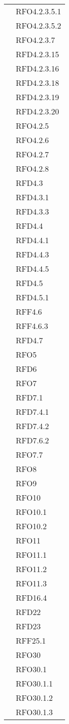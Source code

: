\begin{longtable}{|>{\centering}m{10cm}|m{3cm}<{\centering}|}
& RFO4.2.3.5.1\\
& RFO4.2.3.5.2\\
& RFO4.2.3.7\\
& RFD4.2.3.15\\
& RFD4.2.3.16\\
& RFD4.2.3.18\\
& RFD4.2.3.19\\
& RFD4.2.3.20\\
& RFO4.2.5\\
& RFO4.2.6\\
& RFO4.2.7\\
& RFO4.2.8\\
& RFD4.3\\
& RFD4.3.1\\
& RFD4.3.3\\
& RFD4.4\\
& RFD4.4.1\\
& RFD4.4.3\\
& RFD4.4.5\\
& RFD4.5\\
& RFD4.5.1\\
& RFF4.6\\
& RFF4.6.3\\
& RFD4.7\\
& RFO5\\
& RFD6\\
& RFO7\\
& RFD7.1\\
& RFD7.4.1\\
& RFD7.4.2\\
& RFD7.6.2\\
& RFO7.7\\
& RFO8\\
& RFO9\\
& RFO10\\
& RFO10.1\\
& RFO10.2\\
& RFO11\\
& RFO11.1\\
& RFO11.2\\
& RFO11.3\\
& RFD16.4\\
& RFD22\\
& RFD23\\
& RFF25.1\\
& RFO30\\
& RFO30.1\\
& RFO30.1.1\\
& RFO30.1.2\\
& RFO30.1.3\\

\end{longtable}

